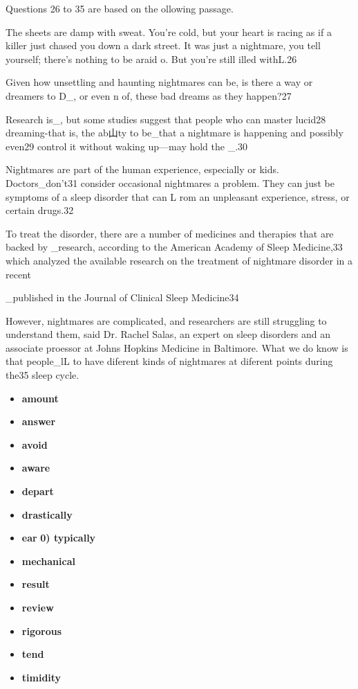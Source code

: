 \documentclass[UTF8,11pt]{ctexart}
\begin{document}
Questions 26 to 35 are based on the ollowing passage.


The sheets are damp with sweat. You're cold, but your heart is racing as if a killer just chased you down a dark street. It was just a nightmare, you tell yourself; there's nothing to be araid o. But you're still illed withL.26


Given how unsettling and haunting nightmares can be, is there a way or dreamers to D\_, or even n of, these bad dreams as they happen?27


Research is\_, but some studies suggest that people who can master lucid28 dreaming-that is, the ab山ty to be\_that a nightmare is happening and possibly even29 control it without waking up—may hold the \_.30


Nightmares are part of the human experience, especially or kids. Doctors\_don't31 consider occasional nightmares a problem. They can just be symptoms of a sleep disorder that can L rom an unpleasant experience, stress, or certain drugs.32


To treat the disorder, there are a number of medicines and therapies that are backed by \_research, according to the American Academy of Sleep Medicine,33 which analyzed the available research on the treatment of nightmare disorder in a recent


\_published in the Journal of Clinical Sleep Medicine34


However, nightmares are complicated, and researchers are still struggling to understand them, said Dr. Rachel Salas, an expert on sleep disorders and an associate proessor at Johns Hopkins Medicine in Baltimore. What we do know is that people\_lL to have diferent kinds of nightmares at diferent points during the35 sleep cycle.


\begin{itemize}[leftmargin=2em,itemsep=.2em,topsep=.4em]\item[A.] \textbf{amount}
\item[B.] \textbf{answer}
\item[C.] \textbf{avoid}
\item[D.] \textbf{aware}
\item[E.] \textbf{depart}
\item[F.] \textbf{drastically}
\item[G.] \textbf{ear} \textbf{0) typically}
\item[I.] \textbf{mechanical}
\item[J.] \textbf{result}
\item[K.] \textbf{review}
\item[L.] \textbf{rigorous}
\item[M.] \textbf{tend}
\item[N.] \textbf{timidity}
\end{itemize}
\end{document}
